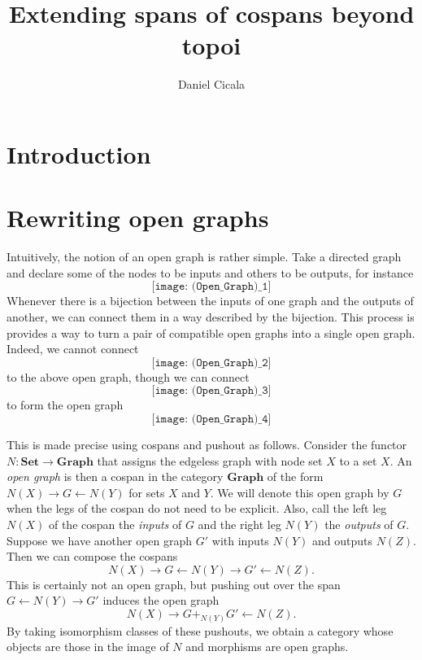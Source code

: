 \documentclass[11pt]{amsart}
\newcommand{\cat}[1]{\mathbf{#1}}
\newcommand{\from}{\colon}
\theoremstyle{remark}
\theoremstyle{definition}
\begin{document}
	

\begin{abstract}
	
\end{abstract}

\title{Extending spans of cospans beyond topoi}
\author{Daniel Cicala}
\maketitle

\section{Introduction}
\label{sec:Introduction}

\section{Rewriting open graphs}
\label{sec:RewritingOpenGraphs}

Intuitively, the notion of an open graph is rather simple.  Take a directed graph and declare some of the nodes to be inputs and others to be outputs, for instance
\[
\texttt{[image: (Open\_Graph)\_1]}
\]
Whenever there is a bijection between the inputs of one graph and the outputs of another, we can connect them in a way described by the bijection.  This process is provides a way to turn a pair of compatible open graphs into a single open graph.  Indeed, we cannot connect 
\[
\texttt{[image: (Open\_Graph)\_2]}
\]
to the above open graph, though we can connect 
\[
\texttt{[image: (Open\_Graph)\_3]}
\]
to form the open graph
\[
\texttt{[image: (Open\_Graph)\_4]}
\]

This is made precise using cospans and pushout as follows. Consider the functor $N \from \cat{Set} \to \cat{Graph}$ that assigns the edgeless graph with node set $X$ to a set $X$.  An \emph{open graph} is then a cospan in the category $\cat{Graph}$ of the form $N(X) \to G \gets N(Y)$ for sets $X$ and $Y$. We will denote this open graph by $G$ when the legs of the cospan do not need to be explicit.  Also, call the left leg $N(X)$ of the cospan the \emph{inputs} of $G$ and the right leg $N(Y)$ the \emph{outputs} of $G$.  Suppose we have another open graph $G'$ with inputs $N(Y)$ and outputs $N(Z)$.  Then we can compose the cospans 
\[
N(X) \to G \gets N(Y) \to G' \gets N(Z). 
\] 
This is certainly not an open graph, but pushing out over the span $G \gets N(Y) \to G'$ induces the open graph  
\[
N(X) \to G +_{N(Y)} G' \gets N(Z).
\] 
By taking isomorphism classes of these pushouts, we obtain a category whose objects are those in the image of $N$ and morphisms are open graphs. 
\end{document}
